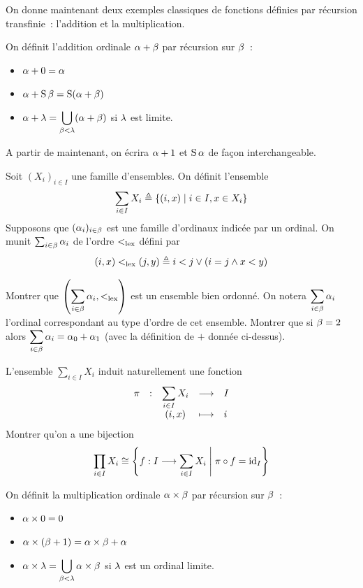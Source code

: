 On donne maintenant deux exemples classiques de fonctions définies par récursion
transfinie~: l'addition et la multiplication.

\begin{definition}
  On définit l'addition ordinale $\alpha + \beta$ par récursion sur $\beta$~:
  \begin{itemize}
  \item $\alpha + 0 = \alpha$
  \item $\alpha + \operatorname{S}\beta = \operatorname{S}(\alpha + \beta)$
  \item $\displaystyle\alpha+\lambda=\bigcup_{\beta < \lambda}(\alpha+\beta)$
    si $\lambda$ est limite.
  \end{itemize}
\end{definition}

\begin{notation}
  A partir de maintenant, on écrira $\alpha + 1$ et $\operatorname{S}\alpha$ de façon
  interchangeable.
\end{notation}

\begin{exercise}
  Soit $(X_i)_{i\in I}$ une famille d'ensembles. On définit l'ensemble
  \[\sum_{i\in I} X_i \triangleq \left\{ (i,x) \;\middle\vert\; i\in I, x \in X_i \right\}\]
  Supposons que $(\alpha_i)_{i\in \beta}$ est une famille d'ordinaux indicée par
  un ordinal. On munit $\sum_{i\in\beta} \alpha_i$ de l'ordre $<_{\mathrm{lex}}$ défini par
  \[(i,x)<_{\mathrm{lex}} (j,y) \triangleq i < j \lor (i = j \land x < y)\]

  Montrer que $\displaystyle\left(\sum_{i\in \beta}\alpha_i,<_{\mathrm{lex}}\right)$ est un
  ensemble bien ordonné. On notera $\displaystyle\sum_{i\in\beta}\alpha_i$
  l'ordinal correspondant au type d'ordre de cet ensemble. Montrer que si
  $\beta = 2$ alors $\displaystyle\sum_{i\in\beta}\alpha_i = \alpha_0 + \alpha_1$
  (avec la définition de $+$ donnée ci-dessus).
\end{exercise}

\begin{exercise}
  L'ensemble $\sum_{i\in I} X_i$ induit naturellement une fonction
  \[\makeFun{\proj}{\sum_{i\in I}X_i}{I}{(i,x)}{i}\]
  Montrer qu'on a une bijection
  \[\prod_{i \in I} X_i \cong
  \left\{ f : \displaystyle I \longrightarrow \sum_{i \in I} X_i \;\middle\vert\; \pi\circ f = \operatorname{id}_I \right\}\]
\end{exercise}

\begin{definition}
  On définit la multiplication ordinale $\alpha\times \beta$ par récursion sur
  $\beta$~:
  \begin{itemize}
  \item $\alpha \times 0 = 0$
  \item $\alpha \times (\beta + 1) = \alpha \times \beta + \alpha$
  \item
    $\displaystyle\alpha\times\lambda=\bigcup_{\beta < \lambda}\alpha\times\beta$
    si $\lambda$ est un ordinal limite.
  \end{itemize}
\end{definition}

